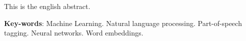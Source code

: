 \begin{resumo}[Abstract]
 This is the english abstract.

 \vspace{\onelineskip}
 
 \noindent 
 \textbf{Key-words}: Machine Learning. Natural language processing. Part-of-speech tagging. Neural networks. Word embeddings.
\end{resumo}
